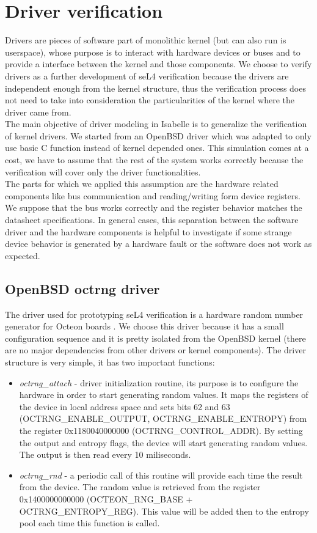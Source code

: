 \documentclass[conference]{IEEEtran}
\begin{document}
\section{Driver verification}
Drivers are pieces of software part of monolithic kernel (but can also run is userspace), whose purpose is to interact with hardware devices or buses and to provide a interface between the kernel and those components. We choose to verify drivers as a further development of seL4 verification because the drivers are independent enough from the kernel structure, thus the verification process does not need to take into consideration the particularities of the kernel where the driver came from. \\
The main objective of driver modeling in Isabelle is to generalize the verification of kernel drivers. We started from an OpenBSD driver which was adapted to only use basic C function instead of kernel depended ones. This simulation comes at a cost, we have to assume that the rest of the system works correctly because the verification will cover only the driver functionalities. \\
The parts for which we applied this assumption are the hardware related components like bus communication and reading/writing form device registers. We suppose that the bus works correctly and the register behavior matches the datasheet specifications. In general cases, this separation between the software driver and the hardware components is helpful to investigate if some strange device behavior is generated by a hardware fault or the software does not work as expected.

\subsection{OpenBSD octrng driver}
The driver used for prototyping seL4 verification is a hardware random number generator for Octeon boards \cite{octrng}. We choose this driver because it has a small configuration sequence and it is pretty isolated from the OpenBSD kernel (there are no major dependencies from other drivers or kernel components). The driver structure is very simple, it has two important functions:
\begin{itemize}
    \item \textit{octrng\_attach} - driver initialization routine, its purpose is to configure the hardware in order to start generating random values. It maps the registers of the device in local address space and sets bits 62 and 63 (OCTRNG\_ENABLE\_OUTPUT, OCTRNG\_ENABLE\_ENTROPY) from the register 0x1180040000000 (OCTRNG\_CONTROL\_ADDR). By setting the output and entropy flags, the device will start generating random values. The output is then read every 10 miliseconds.
    \item \textit{octrng\_rnd} - a periodic call of this routine will provide each time the result from the device. The random value is retrieved from the register 0x1400000000000 (OCTEON\_RNG\_BASE + OCTRNG\_ENTROPY\_REG). This value will be added then to the entropy pool each time this function is called.
\end{itemize}
\end{document}
